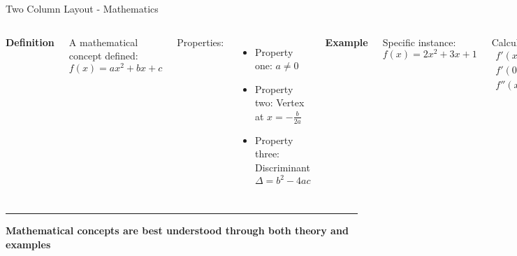 \documentclass[8pt,aspectratio=169]{beamer}
\newcommand{\bottomnote}[1]{%
\vfill
\vspace{-2mm}
\textcolor{mllavender2}{\rule{\textwidth}{0.4pt}}
\vspace{1mm}
\footnotesize
\textbf{#1}
}
\begin{document}
\begin{frame}[t]{Two Column Layout - Mathematics}
\begin{columns}[T]
\textbf{Definition}

A mathematical concept defined:
$$f(x) = ax^2 + bx + c$$

Properties:
\begin{itemize}
\item Property one: $a \neq 0$
\item Property two: Vertex at $x = -\frac{b}{2a}$
\item Property three: Discriminant $\Delta = b^2 - 4ac$
\end{itemize}

\textbf{Example}

Specific instance:
$$f(x) = 2x^2 + 3x + 1$$

Calculation:
\begin{align*}
f'(x) &= 4x + 3 \\
f'(0) &= 3 \\
f''(x) &= 4
\end{align*}

Result: Minimum at $x = -\frac{3}{4}$
\end{columns}

\bottomnote{Mathematical concepts are best understood through both theory and examples}
\end{frame}
\end{document}
